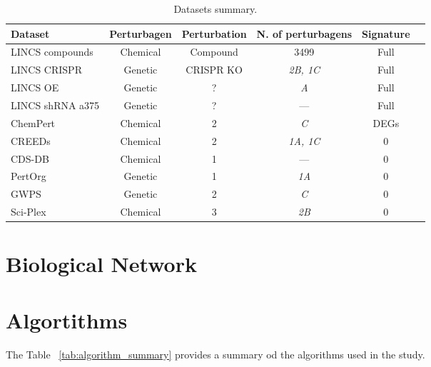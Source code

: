 \bgroup
\begin{xltabular}{\textwidth}{Xccccc}
    \caption{Datasets summary.}
    \label{tab:dataset_summary} \\
    \toprule
    \textbf{Dataset}                & \textbf{Perturbagen}     & \textbf{Perturbation}  & \textbf{N. of perturbagens}    & \textbf{Signature} \\
    \midrule
LINCS compounds            & Chemical        & Compound      & 3499                  & Full      \\
LINCS CRISPR               & Genetic         & CRISPR KO     & \emph{2B, 1C}         & Full      \\
LINCS OE                   & Genetic         & ?             & \emph{A}              & Full      \\
LINCS shRNA a375           & Genetic         & ?             & ---                   & Full      \\
ChemPert                   & Chemical        & 2             & \emph{C}              & DEGs      \\
CREEDs                     & Chemical        & 2             & \emph{1A, 1C}         & 0 \\
CDS-DB                     & Chemical        & 1             & ---                   & 0 \\
PertOrg                    & Genetic         & 1             & \emph{1A}             & 0 \\
GWPS                       & Genetic         & 2             & \emph{C}              & 0 \\
Sci-Plex                   & Chemical        & 3             & \emph{2B}             & 0 \\
    \bottomrule
    \end{xltabular}
\egroup


\section{Biological Network} %
\label{sec:biological_network}



\section{Algortithms} %
\label{sec:algorithms}

The Table ~\ref{tab:algorithm_summary} provides a summary od the algorithms used in the study.

